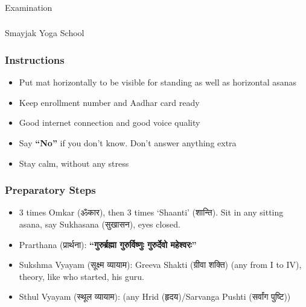 \begin{frame}[fragile]\frametitle{}
\begin{center}
{\Large Examination}
\end{center}
\end{frame}


\begin{frame}[fragile]\frametitle{}
\begin{center}
{\Large Smayjak Yoga School}
\end{center}
\end{frame}

\begin{frame}[fragile]\frametitle{Instructions}
    \begin{itemize}
        \item Put mat horizontally to be visible for standing as well as horizontal asanas
        \item Keep enrollment number and Aadhar card ready
        \item Good internet connection and good voice quality
        \item Say \textbf{“No”} if you don’t know. Don’t answer anything extra
        \item Stay calm, without any stress
    \end{itemize}
\end{frame}

\begin{frame}[fragile]\frametitle{Preparatory Steps}
    \begin{itemize}
        \item 3 times Omkar (ॐकार), then 3 times ‘Shaanti’ (शान्ति). Sit in any sitting asana, say Sukhasana (सुखासन), eyes closed.
        \item Prarthana (प्रार्थना): \textbf{“गुरुर्ब्रह्मा गुरुर्विष्णुः गुरुर्देवो महेश्वरः”}
        \item Sukshma Vyayam (सूक्ष्म व्यायाम): Greeva Shakti (ग्रीवा शक्ति) (any from I to IV), theory, like who started, his guru.
        \item Sthul Vyayam (स्थूल व्यायाम): (any Hrid (हृदय)/Sarvanga Pushti (सर्वांग पुष्टि))
    \end{itemize}
\end{frame}


